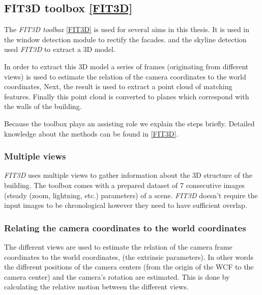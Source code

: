 \subsection{FIT3D toolbox \ref{FIT3D}}
\label{sec:prelimFIT3D}
The \emph{FIT3D toolbox} \ref{FIT3D} is used for several aims in this thesis.
It is used in the window detection module to rectify the facades.
and the skyline detection used \emph{FIT3D} to extract a 3D model.

In order to extract this 3D model a series of frames (originating from different
views) is used to estimate the relation of the camera coordinates to the
world coordinates, Next, the result is used to extract a point cloud of matching
features. Finally this point cloud is converted to planes which correspond with the walls of the building.

Because the toolbox plays an assisting role we explain the steps briefly.
Detailed knowledge about the methods can be found in \ref{FIT3D}.

\subsubsection{Multiple views}
\emph{FIT3D} uses multiple views to gather information about the 3D structure of the
building. The toolbox comes with a prepared dataset of 7 consecutive images (steady (zoom, lightning,
etc.) parameters) of a scene.  \emph{FIT3D} doesn't require the input images to be
chronological however they need to have sufficient overlap. 


\subsubsection{Relating the camera coordinates to the world coordinates}
The different views are used to estimate the relation of the camera frame
coordinates to the world coordinates, (the extrinsic parameters).  In other
words the different positions of the camera centers (from the origin of the WCF
to the camera center) and the camera's rotation are
estimated.  This is done by calculating the relative motion between the
different views.\\

